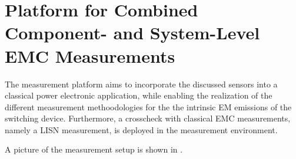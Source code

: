 
\chapter{Platform for Combined Component- and System-Level EMC Measurements}
\label{ch:TestBench}

The measurement platform aims to incorporate the discussed sensors into a classical power electronic application, while enabling the realization of the different measurement methoodologies for the the intrinsic EM emissions of the switching device.
Furthermore, a crosscheck with classical EMC measurements, namely a LISN measurement, is deployed in the measurement environment.

A picture of the measurement setup is shown in .








